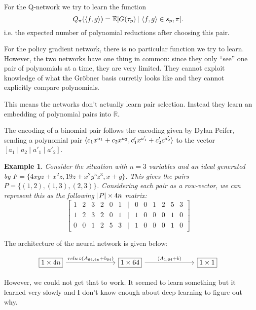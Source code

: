 \documentclass{article}
\theoremstyle{changedot}
\theoremstyle{changedotbreak}
\theoremstyle{nonumberplain}
\newtheorem{example}{Example}
\DeclarePairedDelimiter{\tuple}{\langle}{\rangle}
\newcommand{\m}{\mathbb}
\DeclarePairedDelimiter{\abs}{\lvert}{\rvert}
\newcommand{\card}[1]{\abs{#1}}
\begin{document}
For the Q-network we try to learn the function \[Q_{\pi}(\tuple{f, g}) = \m E[G(\tau_{p}) \mid \tuple{f, g} \in s_{p}, \pi].\] i.e. the expected number of polynomial reductions after choosing this pair.

For the policy gradient network, there is no particular function we try to learn. However, the two networks have one thing in common: since they only ``see'' one pair of polynomials at a time, they are very limited. They cannot exploit knowledge of what the Gröbner basis curretly looks like and they cannot explicitly compare polynomials.

This means the networks don't actually learn pair selection. Instead they learn an embedding of polynomial pairs into $\m R$. 

The encoding of a binomial pair follows the encoding given by Dylan Peifer, sending a polynomial pair $\tuple{c_{1}x^{a_{1}} + c_{2}x^{a_{2}}, c'_{1}x^{a'_{1}} + c'_{2} c^{a'_{2}}}$ to the vector $[a_{1} \mid a_{2} \mid a'_{1} \mid a'_{2}]$.

\begin{example}
  Consider the situation with $n=3$ variables and an ideal generated by $F = \{4xyz + x^{2}z, 19z + x^{2}y^{5}z^{3}, x + y\}$. This gives the pairs $P = \{(1, 2), (1, 3), (2, 3)\}$. Considering each pair as a row-vector, we can represent this as the following $\card P \times 4n$ matrix:
  \[\begin{bmatrix}
      1 & 2 & 3 & 2 & 0 & 1 &\mid & 0 & 0 & 1 & 2 & 5 & 3 \\
      1 & 2 & 3 & 2 & 0 & 1 &\mid & 1 & 0 & 0 & 0 & 1 & 0 \\
      0 & 0 & 1 & 2 & 5 & 3 &\mid & 1 & 0 & 0 & 0 & 1 & 0
    \end{bmatrix}\]
\end{example}

The architecture of the neural network is given below:

\[\begin{tikzcd}
	{\boxed{1 \times 4n}} &&& {\boxed{1 \times 64}} &&& {\boxed{1\times1}}
	\arrow["{relu \,\circ (A_{64, 4n} + b_{64})}", from=1-1, to=1-4]
	\arrow["{(A_{1, 64} + b)}", from=1-4, to=1-7]
\end{tikzcd}\]

However, we could not get that to work. It seemed to learn something but it learned very slowly and I don't know enough about deep learning to figure out why.
\end{document}
